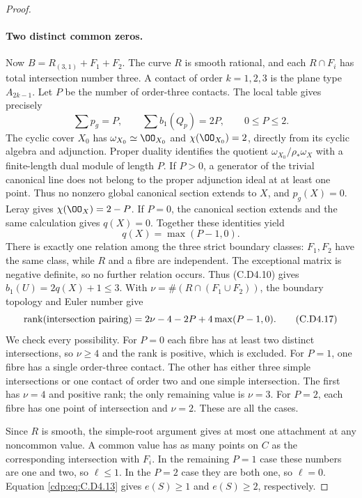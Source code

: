 \begin{proof}
\paragraph{Two distinct common zeros.}
Now $B=R_{(3,1)}+F_1+F_2$. The curve $R$ is smooth rational,
and each $R\cap F_i$ has total intersection number three.
A contact of order $k=1,2,3$ is the plane type $A_{2k-1}$.
Let $P$ be the number of order-three contacts. The local
table gives precisely
\[
              \sum p_g=P,\qquad \sum b_1(Q_p)=2P,
                         \qquad 0\le P\le2.
\tag{C.D4.15}\label{cdp:eq:C.D4.15}
\]
The cyclic cover $X_0$ has $\omega_{X_0}\simeq\OO_{X_0}$
and $\chi(\OO_{X_0})=2$, directly from its cyclic algebra
and adjunction. Proper duality identifies the quotient
$\omega_{X_0}/\rho_*\omega_X$ with a finite-length dual
module of length $P$. If $P>0$, a generator of the trivial
canonical line does not belong to the proper adjunction
ideal at at least one point. Thus no nonzero global
canonical section extends to $X$, and $p_g(X)=0$.
Leray gives $\chi(\OO_X)=2-P$. If $P=0$, the canonical
section extends and the same calculation gives $q(X)=0$.
Together these identities yield
\[
                         q(X)=\max(P-1,0).
\tag{C.D4.16}\label{cdp:eq:C.D4.16}
\]
There is exactly one relation among the three strict
boundary classes: $F_1,F_2$ have the same class, while
$R$ and a fibre are independent. The exceptional matrix
is negative definite, so no further relation occurs.
Thus (C.D4.10) gives $b_1(U)=2q(X)+1\le3$. With
$\nu=\#(R\cap(F_1\cup F_2))$, the boundary topology
and Euler number give
\[
 \operatorname{rank}(\hbox{intersection pairing})
          =2\nu-4-2P+4\max(P-1,0).
\tag{C.D4.17}\label{cdp:eq:C.D4.17}
\]
We check every possibility. For $P=0$ each fibre has at
least two distinct intersections, so $\nu\ge4$ and the
rank is positive, which is excluded. For $P=1$, one fibre
has a single order-three contact. The other has either
three simple intersections or one contact of order two
and one simple intersection. The first has $\nu=4$ and
positive rank; the only remaining value is $\nu=3$.
For $P=2$, each fibre has one point of intersection and
$\nu=2$. These are all the cases.

Since $R$ is smooth, the simple-root argument gives at
most one attachment at any noncommon value. A common
value has as many points on $C$ as the corresponding
intersection with $F_i$. In the remaining $P=1$ case
these numbers are one and two, so $\ell\le1$. In the
$P=2$ case they are both one, so $\ell=0$.
Equation \eqref{cdp:eq:C.D4.13} gives $e(S)\ge1$ and $e(S)\ge2$,
respectively.


\end{proof}
